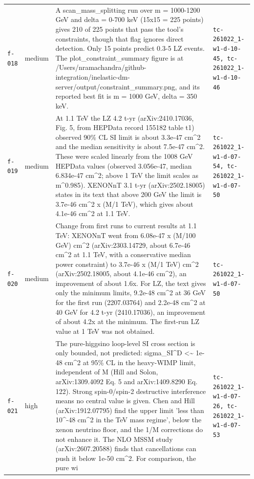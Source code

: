 \documentclass[11pt,a4paper]{article}
\begin{document}
\begin{longtable}{@{}p{}p{}p{}p{}@{}}
\texttt{f-018} & medium & A scan\_mass\_splitting run over m = 1000-1200 GeV and delta = 0-700 keV (15x15 = 225 points) gives 210 of 225 points that pass the tool's constraints, though that flag ignores direct detection. Only 15 points predict 0.3-5 LZ events. The plot\_constraint\_summary figure is at /Users/nramachandra/github-integration/inelastic-dm-server/output/constraint\_summary.png, and its reported best fit is m = 1000 GeV, delta = 350 keV. & \texttt{tc-261022\_\allowbreak{}1-w1-d-10-45,\allowbreak{} tc-261022\_\allowbreak{}1-w1-d-10-46} \\
\texttt{f-019} & medium & At 1.1 TeV the LZ 4.2 t-yr (arXiv:2410.17036, Fig. 5, from HEPData record 155182 table t1) observed 90\% CL SI limit is about 3.3e-47 cm\textasciicircum{}2 and the median sensitivity is about 7.5e-47 cm\textasciicircum{}2. These were scaled linearly from the 1008 GeV HEPData values (observed 3.056e-47, median 6.834e-47 cm\textasciicircum{}2; above 1 TeV the limit scales as m\textasciicircum{}0.985). XENONnT 3.1 t-yr (arXiv:2502.18005) states in its text that above 200 GeV the limit is 3.7e-46 cm\textasciicircum{}2 x (M/1 TeV), which gives about 4.1e-46 cm\textasciicircum{}2 at 1.1 TeV. & \texttt{tc-261022\_\allowbreak{}1-w1-d-07-54,\allowbreak{} tc-261022\_\allowbreak{}1-w1-d-07-50} \\
\texttt{f-020} & medium & Change from first runs to current results at 1.1 TeV: XENONnT went from 6.08e-47 x (M/100 GeV) cm\textasciicircum{}2 (arXiv:2303.14729, about 6.7e-46 cm\textasciicircum{}2 at 1.1 TeV, with a conservative median power constraint) to 3.7e-46 x (M/1 TeV) cm\textasciicircum{}2 (arXiv:2502.18005, about 4.1e-46 cm\textasciicircum{}2), an improvement of about 1.6x. For LZ, the text gives only the minimum limits, 9.2e-48 cm\textasciicircum{}2 at 36 GeV for the first run (2207.03764) and 2.2e-48 cm\textasciicircum{}2 at 40 GeV for 4.2 t-yr (2410.17036), an improvement of about 4.2x at the minimum. The first-run LZ value at 1 TeV was not obtained. & \texttt{tc-261022\_\allowbreak{}1-w1-d-07-50} \\
\texttt{f-021} & high & The pure-higgsino loop-level SI cross section is only bounded, not predicted: sigma\_SI\textasciicircum{}D \textless{}\textasciitilde{} 1e-48 cm\textasciicircum{}2 at 95\% CL in the heavy-WIMP limit, independent of M (Hill and Solon, arXiv:1309.4092 Eq. 5 and arXiv:1409.8290 Eq. 122). Strong spin-0/spin-2 destructive interference means no central value is given. Chen and Hill (arXiv:1912.07795) find the upper limit 'less than 10\textasciicircum{}-48 cm\textasciicircum{}2 in the TeV mass regime', below the xenon neutrino floor, and the 1/M corrections do not enhance it. The NLO MSSM study (arXiv:2607.20588) finds that cancellations can push it below 1e-50 cm\textasciicircum{}2. For comparison, the pure wi & \texttt{tc-261022\_\allowbreak{}1-w1-d-07-26,\allowbreak{} tc-261022\_\allowbreak{}1-w1-d-07-53} \\

\end{longtable}
\end{document}
